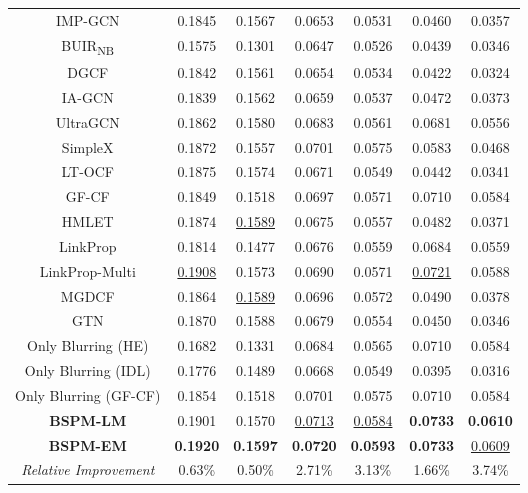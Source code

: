 \documentclass[sigconf,natbib=true]{acmart}
\begin{document}
\begin{table}[ht!]
\begin{tabular}{c cc cc cc}
        IMP-GCN                 & 0.1845 & 0.1567           & 0.0653 & 0.0531  & 0.0460 & 0.0357 \\
        {BUIR\textsubscript{NB}}             & 0.1575 & 0.1301           & 0.0647 & 0.0526  & 0.0439 & 0.0346 \\
        DGCF                    & 0.1842 & 0.1561           & 0.0654 & 0.0534  & 0.0422 & 0.0324 \\
        {IA-GCN}                  & 0.1839 & 0.1562           & 0.0659 & 0.0537  & 0.0472 & 0.0373 \\
        UltraGCN                & 0.1862 & 0.1580 & 0.0683 & 0.0561  & 0.0681 & 0.0556 \\
        {SimpleX}                 & 0.1872 & 0.1557           & 0.0701 & 0.0575  & 0.0583 & 0.0468 \\
        LT-OCF                  & 0.1875 & 0.1574           & 0.0671 & 0.0549  & 0.0442 & 0.0341 \\
        GF-CF                   & 0.1849 & 0.1518           & 0.0697 & 0.0571  & 0.0710 & 0.0584 \\
        HMLET            & 0.1874 & \underline{0.1589} & 0.0675 & 0.0557  & 0.0482 & 0.0371 \\
        LinkProp                & 0.1814 & 0.1477           & 0.0676 & 0.0559  & 0.0684 & 0.0559 \\
        LinkProp-Multi          & \underline{0.1908} & 0.1573
                                                            & 0.0690 & 0.0571  & \underline{0.0721} & 0.0588 \\
        MGDCF        & 0.1864 & \underline{0.1589}
                                                            & 0.0696 & 0.0572  & 0.0490 & 0.0378 \\
        GTN              & 0.1870 & 0.1588           & 0.0679 & 0.0554  & 0.0450 & 0.0346 \\
        \midrule
        Only Blurring (HE)      & 0.1682 & 0.1331           & 0.0684 & 0.0565  & 0.0710 & 0.0584 \\
        Only Blurring (IDL)     & 0.1776 & 0.1489           & 0.0668 & 0.0549  & 0.0395 & 0.0316 \\
        Only Blurring (GF-CF)   & 0.1854 & 0.1518           & 0.0701 & 0.0575 & 0.0710  & 0.0584\\
        \midrule
        \textbf{BSPM-LM}        & 0.1901 & 0.1570          & \underline{0.0713} & \underline{0.0584}  & \textbf{0.0733} & \textbf{0.0610}\\
        \textbf{BSPM-EM}        & \textbf{0.1920} & \textbf{0.1597}
                                                            & \textbf{0.0720} & \textbf{0.0593}  & \textbf{0.0733} & \underline{0.0609}\\
        \midrule
        \textit{Relative Improvement}    
                                & 0.63\% & 0.50\% & 2.71\% & 3.13\% & 1.66\% & 3.74\% \\
        \bottomrule
    \end{tabular}
    \label{tbl:main_exp}
\end{table}
\end{document}
